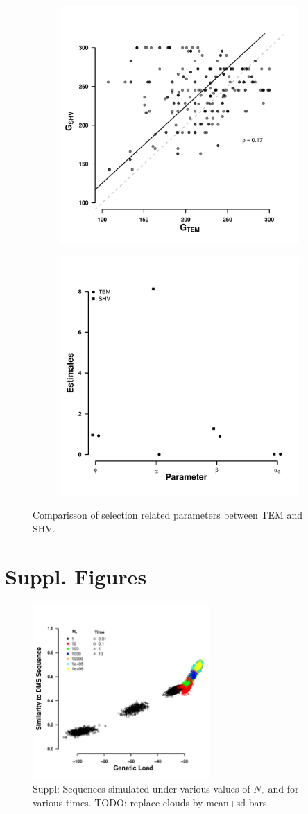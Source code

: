 \documentclass[12pt]{article}
\begin{document}
\begin{figure}[h]
    \centering
    \begin{subfigure}
        \centering
        \includegraphics[width=.45\textwidth]{img/g_shift_lac.pdf}
    \end{subfigure}
    \begin{subfigure}
        \centering
        \includegraphics[width=.45\textwidth]{img/TEM_SHV_2016_par_comp.pdf}
    \end{subfigure}
    \caption{Comparisson of selection related parameters between TEM and SHV.}
    \label{fig:tem_shv_param_comp}
\end{figure}



\section*{Suppl. Figures}

\begin{figure}[H]
     \centering
	\includegraphics[width=0.6\textwidth]{img/simulated_seqs_gl_dist.pdf}
	\caption{Suppl: Sequences simulated under various values of $N_e$ and for various times. TODO: replace clouds by mean+sd bars}
	\label{fig:sim_seqs}
\end{figure}
\end{document}
